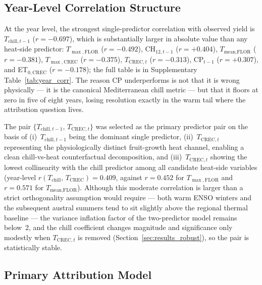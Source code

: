 \documentclass[agronomy,article,submit,pdftex,moreauthors]{Definitions/mdpi}
\begin{document}
\subsection{Year-Level Correlation Structure}
\label{sec:results_corr}

At the year level, the strongest single-predictor correlation with observed yield is $T_{\text{chill},t-1}$ ($r=-0.697$), which is substantially larger in absolute value than any heat-side predictor: $T_{\max,\text{FLOR}}$ ($r=-0.492$), CH$_{12,t-1}$ ($r=+0.404$), $T_{\text{mean},\text{FLOR}}$ ($r=-0.381$), $T_{\max,\text{CREC}}$ ($r=-0.375$), $T_{\text{CREC},t}$ ($r=-0.313$), CP$_{t-1}$ ($r=+0.307$), and ET$_{0,\text{CREC}}$ ($r=-0.178$); the full table is in Supplementary Table~\ref{tab:year_corr}. The reason CP underperforms is not that it is wrong physically --- it is the canonical Mediterranean chill metric --- but that it floors at zero in five of eight years, losing resolution exactly in the warm tail where the attribution question lives.

The pair $\{T_{\text{chill},t-1},\,T_{\text{CREC},t}\}$ was selected as the primary predictor pair on the basis of (i)~$T_{\text{chill},t-1}$ being the dominant single predictor, (ii)~$T_{\text{CREC},t}$ representing the physiologically distinct fruit-growth heat channel, enabling a clean chill-vs-heat counterfactual decomposition, and (iii)~$T_{\text{CREC},t}$ showing the lowest collinearity with the chill predictor among all candidate heat-side variables (year-level $r(T_{\text{chill}},\,T_{\text{CREC}})=0.409$, against $r=0.452$ for $T_{\max,\text{FLOR}}$ and $r=0.571$ for $T_{\text{mean},\text{FLOR}}$). Although this moderate correlation is larger than a strict orthogonality assumption would require --- both warm ENSO winters and the subsequent austral summers tend to sit slightly above the regional thermal baseline --- the variance inflation factor of the two-predictor model remains below~2, and the chill coefficient changes magnitude and significance only modestly when $T_{\text{CREC},t}$ is removed (Section~\ref{sec:results_robust}), so the pair is statistically stable.

\subsection{Primary Attribution Model}
\label{sec:results_primary}
\end{document}
